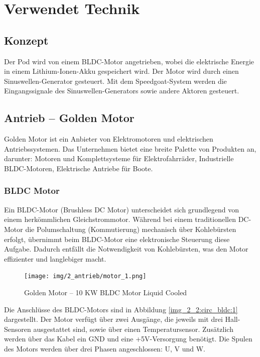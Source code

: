 \chapter{Verwendet Technik}

\section{Konzept}
Der Pod wird von einem BLDC-Motor angetrieben, wobei die elektrische Energie in einem Lithium-Ionen-Akku gespeichert wird. Der Motor wird durch einen Sinuswellen-Generator gesteuert. Mit dem Speedgoat-System werden die Eingangssignale des Sinuswellen-Generators sowie andere Aktoren gesteuert.

\section{Antrieb – Golden Motor}
\label{Golden_Motor}
Golden Motor ist ein Anbieter von Elektromotoren und elektrischen Antriebssystemen. Das Unternehmen bietet eine breite Palette von Produkten an, darunter:
Motoren und Komplettsysteme für Elektrofahrräder, Industrielle BLDC-Motoren, Elektrische Antriebe für Boote.


\subsection{BLDC Motor}
\label{BLDC_Motor}


Ein BLDC-Motor (Brushless DC Motor) unterscheidet sich grundlegend von einem herkömmlichen Gleichstrommotor. Während bei einem traditionellen DC-Motor die Polumschaltung (Kommutierung) mechanisch über Kohlebürsten erfolgt, übernimmt beim BLDC-Motor eine elektronische Steuerung diese Aufgabe. Dadurch entfällt die Notwendigkeit von Kohlebürsten, was den Motor effizienter und langlebiger macht\cite{mathworks:bldc_motor}.

\begin{figure}[ht]
	\begin{center}
		\texttt{[image: img/2\_antrieb/motor\_1.png]}
		\caption{Golden Motor – 10 KW BLDC Motor Liquid Cooled}
		\label{img_2_2:antrieb_motor:1}
	\end{center}
\end{figure}



Die Anschlüsse des BLDC-Motors sind in Abbildung \ref{img_2_2:circ_bldc:1} dargestellt. Der Motor verfügt über zwei Ausgänge, die jeweils mit drei Hall-Sensoren ausgestattet sind, sowie über einen Temperatursensor. Zusätzlich werden über das Kabel ein GND und eine +5V-Versorgung benötigt. Die Spulen des Motors werden über drei Phasen angeschlossen: U, V und W.

